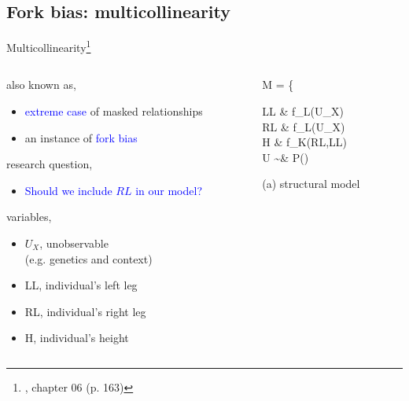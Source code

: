 \subsection{Fork bias: multicollinearity}
%
%
\begin{frame}[t, negative]
	\subsectionpage
\end{frame}
%
%
\begin{frame}
	{Multicollinearity\footnote{\citet{McElreath_2020}, chapter 06 (p. 163)}}
	\begin{columns}
		\begin{column}{0.5\textwidth}
			also known as,
			\begin{itemize}
				\item \textcolor{blue}{extreme case} of masked relationships
				\item an instance of \textcolor{blue}{fork bias}
			\end{itemize}
			
			research question, 
			\begin{itemize}
				\item \textcolor{blue}{Should we include $RL$ in our model?}
			\end{itemize}
			
			variables,
			\begin{itemize}
				\item $U_{X}$, unobservable \\
				(e.g. genetics and context)
				\item LL, individual's left leg
				\item RL, individual's right leg
				\item H, individual's height
			\end{itemize}
		\end{column}
		\begin{column}{0.5\textwidth}  
			\begin{equ}
				M = \left\{ \begin{aligned} 
					LL \leftarrow & \; f_{L}(U_{X}) \\
					RL \leftarrow & \; f_{L}(U_{X}) \\
					H \leftarrow & \; f_{K}(RL,LL) \\
					U \sim & \; P()
				\end{aligned} \right
				\caption*{(a) structural model}
			\end{equ}
			\begin{figure}
\end{figure}
\end{column}
\end{columns}
\end{frame}
